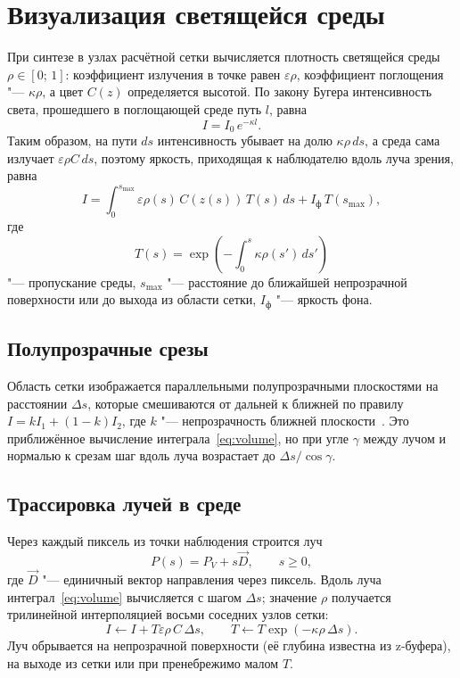 \section{Визуализация светящейся среды}

При синтезе в узлах расчётной сетки вычисляется плотность светящейся среды $\rho \in [0;\, 1]$: коэффициент излучения в точке равен $\varepsilon \rho$, коэффициент поглощения "--- $\kappa \rho$, а цвет $C(z)$ определяется высотой. По закону Бугера интенсивность света, прошедшего в поглощающей среде путь $l$, равна~\cite{landsberg2003}
\begin{equation}
	I = I_0\, e^{-\kappa l}.
	\label{eq:bouguer}
\end{equation}
Таким образом, на пути $ds$ интенсивность убывает на долю $\kappa \rho\, ds$, а среда сама излучает $\varepsilon \rho C\, ds$, поэтому яркость, приходящая к наблюдателю вдоль луча зрения, равна
\begin{equation}
	I = \int_0^{s_{\max}} \varepsilon \rho(s)\, C(z(s))\, T(s)\, ds + I_{\text{ф}}\, T(s_{\max}),
	\label{eq:volume}
\end{equation}
где
\begin{equation}
	T(s) = \exp\left( -\int_0^{s} \kappa \rho(s')\, ds' \right)
	\label{eq:transmittance}
\end{equation}
"--- пропускание среды, $s_{\max}$ "--- расстояние до ближайшей непрозрачной поверхности или до выхода из области сетки, $I_{\text{ф}}$ "--- яркость фона.

\subsection{Полупрозрачные срезы}

Область сетки изображается параллельными полупрозрачными плоскостями на расстоянии $\Delta s$, которые смешиваются от дальней к ближней по правилу $I = k I_1 + (1 - k) I_2$, где $k$ "--- непрозрачность ближней плоскости~\cite[с.~413]{rogers1989}. Это приближённое вычисление интеграла~\eqref{eq:volume}, но при угле $\gamma$ между лучом и нормалью к срезам шаг вдоль луча возрастает до $\Delta s / \cos\gamma$.

\subsection{Трассировка лучей в среде}

Через каждый пиксель из точки наблюдения строится луч~\cite[с.~360--361]{rogers1989}
\begin{equation}
	P(s) = P_V + s \vec{D}, \qquad s \geqslant 0,
	\label{eq:ray}
\end{equation}
где $\vec{D}$ "--- единичный вектор направления через пиксель. Вдоль луча интеграл~\eqref{eq:volume} вычисляется с шагом $\Delta s$; значение $\rho$ получается трилинейной интерполяцией восьми соседних узлов сетки:
\begin{equation}
	I \leftarrow I + T \varepsilon \rho\, C\, \Delta s, \qquad T \leftarrow T \exp(-\kappa \rho\, \Delta s).
	\label{eq:march}
\end{equation}
Луч обрывается на непрозрачной поверхности (её глубина известна из z-буфера), на выходе из сетки или при пренебрежимо малом $T$.

